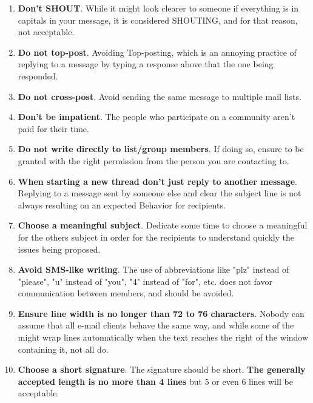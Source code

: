 \documentclass[11pt]{article}
\begin{document}
\begin{enumerate}\itemsep0pt
\item{\textbf{Don't SHOUT}}. While it might look clearer to someone if everything is in capitals in your message, it is considered SHOUTING, and for that reason, not acceptable.
\item{\textbf{Do not top-post}}. Avoiding Top-posting, which is an annoying practice of replying to a message by typing a response above that the one being responded.
\item{\textbf{Do not cross-post}}. Avoid sending the same message to multiple mail lists.
\item{\textbf{Don't be impatient}}. The people who participate on a community aren't paid for their time.
\item{\textbf{Do not write directly to list/group members}}. If doing so, ensure to be granted with the right permission from the person you are contacting to.
\item{\textbf{When starting a new thread don't just reply to another message}}. Replying to a message sent by someone else and clear the subject line is not always resulting on an expected Behavior for recipients.
\item{\textbf{Choose a meaningful subject}}. Dedicate some time to choose a meaningful for the others subject in order for the recipients to understand quickly the issues being proposed.
\item{\textbf{Avoid SMS-like writing}}. The use of abbreviations like "plz" instead of "please", "u" instead of "you", "4" instead of "for", etc. does not favor communication between members, and should be avoided.
\item{\textbf{Ensure line width is no longer than 72 to 76 characters}}. Nobody can assume that all e-mail clients behave the same way, and while some of the might wrap lines automatically when the text reaches the right of the window containing it, not all do.
\item{\textbf{Choose a short signature}}. The signature should be short. \textbf{The generally accepted length is no more than 4 lines} but 5 or even 6 lines will be acceptable.
\end{enumerate}
 
\pagebreak
\end{document}
